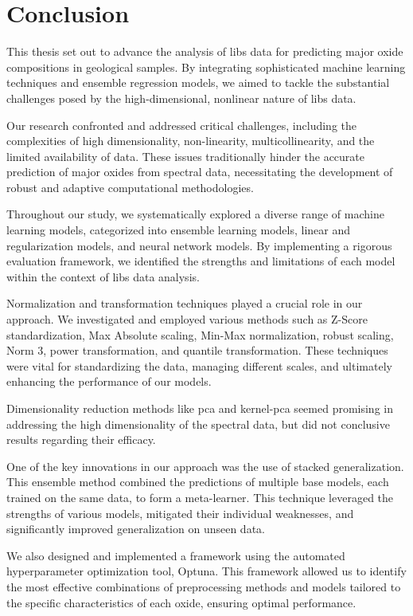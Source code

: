 \section{Conclusion}\label{sec:conclusion}
This thesis set out to advance the analysis of \gls{libs} data for predicting major oxide compositions in geological samples.
By integrating sophisticated machine learning techniques and ensemble regression models, we aimed to tackle the substantial challenges posed by the high-dimensional, nonlinear nature of \gls{libs} data.

Our research confronted and addressed critical challenges, including the complexities of high dimensionality, non-linearity, multicollinearity, and the limited availability of data.
These issues traditionally hinder the accurate prediction of major oxides from spectral data, necessitating the development of robust and adaptive computational methodologies.

Throughout our study, we systematically explored a diverse range of machine learning models, categorized into ensemble learning models, linear and regularization models, and neural network models.
By implementing a rigorous evaluation framework, we identified the strengths and limitations of each model within the context of \gls{libs} data analysis.

Normalization and transformation techniques played a crucial role in our approach.
We investigated and employed various methods such as Z-Score standardization, Max Absolute scaling, Min-Max normalization, robust scaling, Norm 3, power transformation, and quantile transformation.
These techniques were vital for standardizing the data, managing different scales, and ultimately enhancing the performance of our models.

Dimensionality reduction methods like \gls{pca} and \gls{kernel-pca} seemed promising in addressing the high dimensionality of the spectral data, but did not conclusive results regarding their efficacy.

One of the key innovations in our approach was the use of stacked generalization.
This ensemble method combined the predictions of multiple base models, each trained on the same data, to form a meta-learner.
This technique leveraged the strengths of various models, mitigated their individual weaknesses, and significantly improved generalization on unseen data.

We also designed and implemented a framework using the automated hyperparameter optimization tool, Optuna.
This framework allowed us to identify the most effective combinations of preprocessing methods and models tailored to the specific characteristics of each oxide, ensuring optimal performance.

